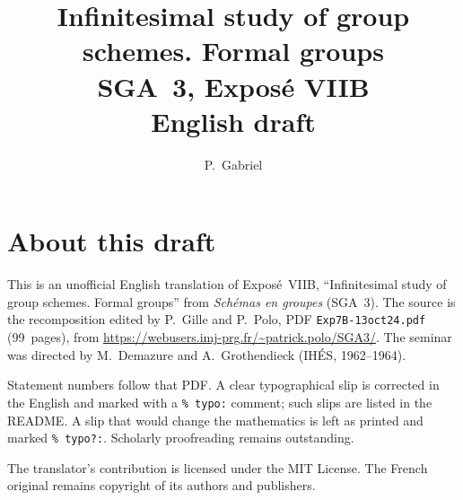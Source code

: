 \documentclass[11pt,a4paper,oneside]{amsbook}
\title[SGA~3, Expos\'e VIIB (English draft)]{Infinitesimal study of group schemes. Formal groups\\
{\normalsize SGA~3, Expos\'e VIIB\\English draft}}
\author{P.\ Gabriel}
\date{}
\begin{document}
\frontmatter
\maketitle

\chapter*{About this draft}
This is an unofficial English translation of Expos\'e~VIIB, ``Infinitesimal study of group schemes. Formal groups''
from \textit{Sch\'emas en groupes} (SGA~3).
The source is the recomposition edited by P.~Gille and P.~Polo,
PDF \texttt{Exp7B-13oct24.pdf} (99~pages),
from \url{https://webusers.imj-prg.fr/~patrick.polo/SGA3/}.
The seminar was directed by M.~Demazure and A.~Grothendieck
(IH\'ES, 1962--1964).

Statement numbers follow that PDF. A clear typographical slip is
corrected in the English and marked with a \texttt{\% typo:} comment;
such slips are listed in the README. A slip that would change the
mathematics is left as printed and marked \texttt{\% typo?:}.
Scholarly proofreading remains outstanding.

The translator's contribution is licensed under the MIT License.
The French original remains copyright of its authors and publishers.

\tableofcontents
\mainmatter















\end{document}
